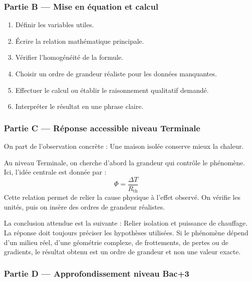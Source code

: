 \documentclass[11pt,a4paper]{article}
\begin{document}
\subsubsection*{Partie B — Mise en équation et calcul}

\begin{enumerate}
  \item Définir les variables utiles.
  \item Écrire la relation mathématique principale.
  \item Vérifier l'homogénéité de la formule.
  \item Choisir un ordre de grandeur réaliste pour les données manquantes.
  \item Effectuer le calcul ou établir le raisonnement qualitatif demandé.
  \item Interpréter le résultat en une phrase claire.
\end{enumerate}

\subsubsection*{Partie C — Réponse accessible niveau Terminale}

\begin{corrigebox}
On part de l'observation concrète : Une maison isolée conserve mieux la chaleur.

Au niveau Terminale, on cherche d'abord la grandeur qui contrôle le phénomène. Ici, l'idée centrale est donnée par :
\[
\Phi=\frac{\Delta T}{R_{\mathrm{th}}}
\]
Cette relation permet de relier la cause physique à l'effet observé. On vérifie les unités, puis on insère des ordres de grandeur réalistes.

La conclusion attendue est la suivante : Relier isolation et puissance de chauffage. La réponse doit toujours préciser les hypothèses utilisées. Si le phénomène dépend d'un milieu réel, d'une géométrie complexe, de frottements, de pertes ou de gradients, le résultat obtenu est un ordre de grandeur et non une valeur exacte.
\end{corrigebox}

\subsubsection*{Partie D — Approfondissement niveau Bac+3}
\end{document}
